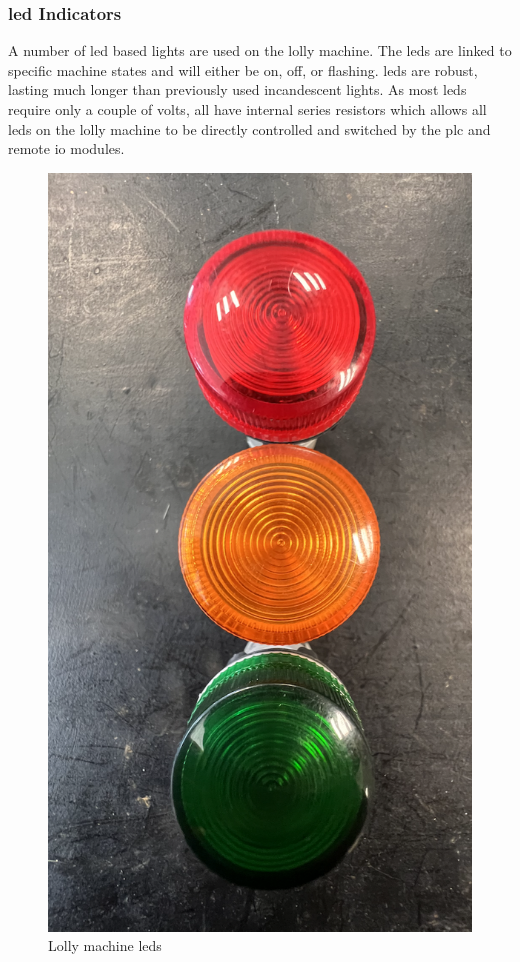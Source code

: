     \subsubsection{\acrshort{led} Indicators}
        A number of \acrshort{led} based lights are used on the lolly machine. The \acrshort{led}s are linked to specific machine states and will either be on, off, or flashing. \acrshort{led}s are robust, lasting much longer than previously used incandescent lights. As most \acrshort{led}s require only a couple of volts, all have internal series resistors which allows all \acrshort{led}s on the lolly machine to be directly controlled and switched by the \acrshort{plc} and remote \acrshort{io} modules.
        
        \begin{figure}[H]
            \centering
            \includegraphics[scale = 0.3]{2_images/leds.png}
            \caption{Lolly machine \acrshort{led}s}
            \label{fig:leds}
        \end{figure} 
        
